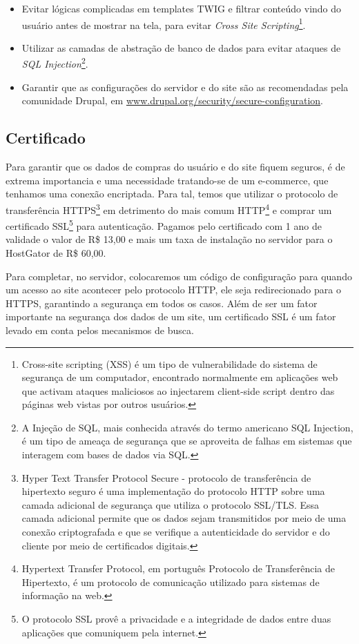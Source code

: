 \documentclass[
	12pt,				%
    oneside,			%
	a4paper,			%
	english,			%
	french,				%
	spanish,			%
	brazil				%
	]{abntex2}
\begin{document}
\begin{itemize}
  \item Evitar lógicas complicadas em templates TWIG e filtrar conteúdo vindo do usuário antes de mostrar na tela, para evitar \textit{Cross Site Scripting}\footnote{Cross-site scripting (XSS) é um tipo de vulnerabilidade do sistema de segurança de um computador, encontrado normalmente em aplicações web que activam ataques maliciosos ao injectarem client-side script dentro das páginas web vistas por outros usuários\cite{XSS}.}.
  \item Utilizar as camadas de abstração de banco de dados para evitar ataques de \textit{SQL Injection}\footnote{A Injeção de SQL, mais conhecida através do termo americano SQL Injection, é um tipo de ameaça de segurança que se aproveita de falhas em sistemas que interagem com bases de dados via SQL\cite{SQLInjection}.}.
  \item Garantir que as configurações do servidor e do site são as recomendadas pela comunidade Drupal, em \url{www.drupal.org/security/secure-configuration}.
\end{itemize}

\subsection{Certificado}
Para garantir que os dados de compras do usuário e do site fiquem seguros, é de extrema importancia e uma necessidade tratando-se de um e-commerce, que tenhamos uma conexão encriptada. Para tal, temos que utilizar o protocolo de transferência HTTPS\footnote{Hyper Text Transfer Protocol Secure - protocolo de transferência de hipertexto seguro é uma implementação do protocolo HTTP sobre uma camada adicional de segurança que utiliza o protocolo SSL/TLS. Essa camada adicional permite que os dados sejam transmitidos por meio de uma conexão criptografada e que se verifique a autenticidade do servidor e do cliente por meio de certificados digitais.} em detrimento do mais comum HTTP\footnote{Hypertext Transfer Protocol, em português Protocolo de Transferência de Hipertexto, é um protocolo de comunicação utilizado para sistemas de informação na web\cite{HTTP}.} e comprar um certificado SSL\footnote{O protocolo SSL provê a privacidade e a integridade de dados entre duas aplicações que comuniquem pela internet\cite{SSL}.} para autenticação. Pagamos pelo certificado com 1 ano de validade o valor de R\$ 13,00 e mais um taxa de instalação no servidor para o HostGator de R\$ 60,00.

Para completar, no servidor, colocaremos um código de configuração para quando um acesso ao site acontecer pelo protocolo HTTP, ele seja redirecionado para o HTTPS, garantindo a segurança em todos os casos.
Além de ser um fator importante na segurança dos dados de um site, um certificado SSL é um fator levado em conta pelos mecanismos de busca.
\end{document}
